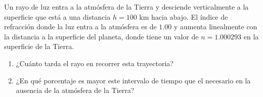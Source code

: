 \item Un rayo de luz entra a la atmósfera de la Tierra y desciende verticalmente a la superficie que está a una distancia $h = 100\text{ km}$ hacia abajo. El índice de refracción donde la luz entra a la atmósfera es de $1.00$ y aumenta linealmente con la distancia a la superficie del planeta, donde tiene un valor de $n = 1.000293$ en la superficie de la Tierra.
\begin{enumerate}
    \item ¿Cuánto tarda el rayo en recorrer esta trayectoria?
    \item ¿En qué porcentaje es mayor este intervalo de tiempo que el necesario en la ausencia de la atmósfera de la Tierra?
\end{enumerate}